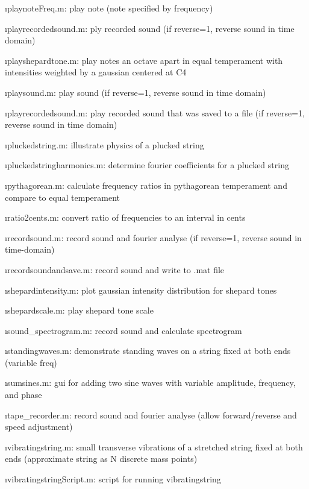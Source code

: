 \i playnoteFreq.m:
play note (note specified by frequency)

\i playrecordedsound.m:
ply recorded sound (if reverse=1, reverse sound in time domain)

\i playshepardtone.m:
play notes an octave apart in equal temperament
with intensities weighted by a gaussian centered at C4

\i playsound.m:
play sound (if reverse=1, reverse sound in time domain)

\i playrecordedsound.m:
play recorded sound that was saved to a file 
(if reverse=1, reverse sound in time domain)

\i pluckedstring.m:
illustrate physics of a plucked string

\i pluckedstringharmonics.m:
determine fourier coefficients for a plucked string

\i pythagorean.m:
calculate frequency ratios in pythagorean temperament and 
compare to equal temperament

\i ratio2cents.m:
convert ratio of frequencies to an interval in cents

\i recordsound.m:
record sound and fourier analyse
(if reverse=1, reverse sound in time-domain)

\i recordsoundandsave.m:
record sound and write to .mat file

\i shepardintensity.m:
plot gaussian intensity distribution for shepard tones

\i shepardscale.m:
play shepard tone scale

\i sound\_spectrogram.m:
record sound and calculate spectrogram

\i standingwaves.m:
demonstrate standing waves on a string fixed at
both ends (variable freq)

\i sumsines.m:
gui for adding two sine waves with variable amplitude, frequency,
and phase

\i tape\_recorder.m:
record sound and fourier analyse 
(allow forward/reverse and speed adjustment)

\i vibratingstring.m:
small transverse vibrations of a stretched string fixed at both ends
(approximate string as N discrete mass points)

\i vibratingstringScript.m:
script for running vibratingstring

\ei

